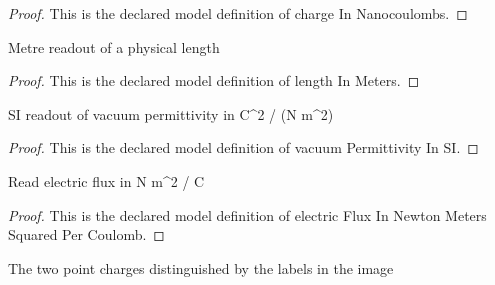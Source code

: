 \begin{proof}
  This is the declared model definition of charge In Nanocoulombs.
\end{proof}
\begin{definition}
  \label{def:physics:phyx-mini-0847:phyxminiproblems-problemphyxmini0847-lengthinmeters}
  Metre readout of a physical length
\end{definition}
\begin{proof}
  This is the declared model definition of length In Meters.
\end{proof}
\begin{definition}
  \label{def:physics:phyx-mini-0847:phyxminiproblems-problemphyxmini0847-vacuumpermittivityinsi}
  SI readout of vacuum permittivity in C\textasciicircum{}2 / (N m\textasciicircum{}2)
\end{definition}
\begin{proof}
  This is the declared model definition of vacuum Permittivity In SI.
\end{proof}
\begin{definition}
  \label{def:physics:phyx-mini-0847:phyxminiproblems-problemphyxmini0847-electricfluxinnewtonmeterssquaredpercoulomb}
  Read electric flux in N m\textasciicircum{}2 / C
\end{definition}
\begin{proof}
  This is the declared model definition of electric Flux In Newton Meters Squared Per Coulomb.
\end{proof}
\begin{definition}
  \label{def:physics:phyx-mini-0847:phyxminiproblems-problemphyxmini0847-figurecharge}
  The two point charges distinguished by the labels in the image
\end{definition}
